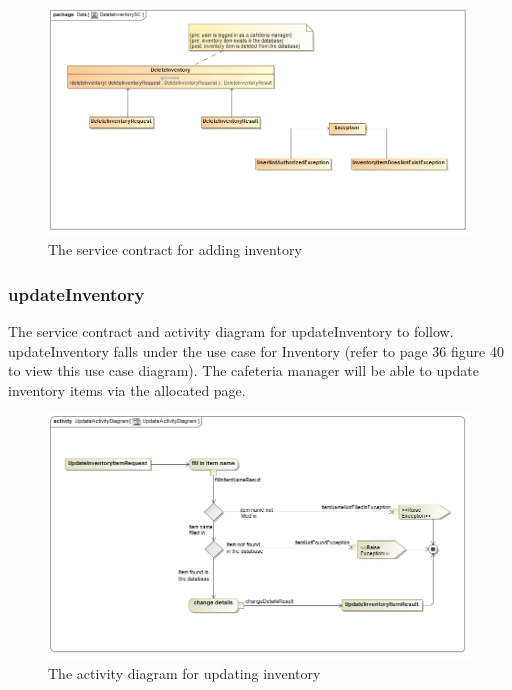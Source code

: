\documentclass[a4paper,12pt]{report}
\begin{document}
\begin{figure}[H]
	\centering
	\includegraphics[width=1.0\textwidth]{../images/DeleteInventorySC.jpg}
	\caption{The service contract for adding inventory}
\end{figure}

\subsubsection{updateInventory}
The service contract and activity diagram for updateInventory to follow. updateInventory falls under the use case for Inventory (refer to page 36 figure 40 to view this use case diagram). The cafeteria manager will be able to update inventory items via the allocated page.
\begin{figure}[H]
  \centering
    \includegraphics[width=1.0\textwidth]{../images/UpdateActivityDiagram.jpg}
    \caption{The activity diagram for updating inventory} 
\end{figure}
\end{document}
